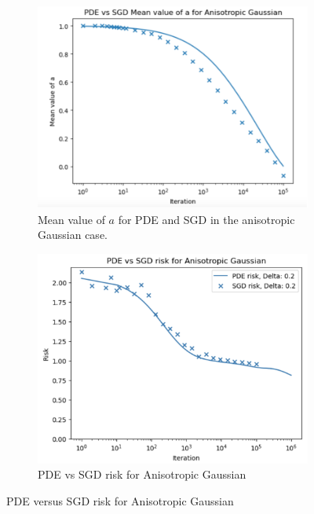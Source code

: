 \documentclass{article}
\begin{document}
\begin{figure}[H]
 \begin{subfigure}{0.5\textwidth}
   \centering
   \includegraphics[width=\linewidth]{images/NGuyen2018-pde-sgd-gauss-anisotropic.png}
   \caption{Mean value of $ a$ for PDE and SGD in the anisotropic Gaussian case.}
   \label{fig: val a anisotropic}
 \end{subfigure}%
 \begin{subfigure}{0.5\textwidth}
   \centering
   \includegraphics[width=\linewidth]{images/NGuyen2018-pde-sgd-risk-gauss-anisotropic.png}
   \caption{PDE vs SGD risk for Anisotropic Gaussian}
   \label{fig: risk anisotropic}
 \end{subfigure}
 \caption{ PDE versus SGD risk for Anisotropic Gaussian}
 \label{fig: anisotropic gaussian case plots}
 \end{figure} 
\end{document}
